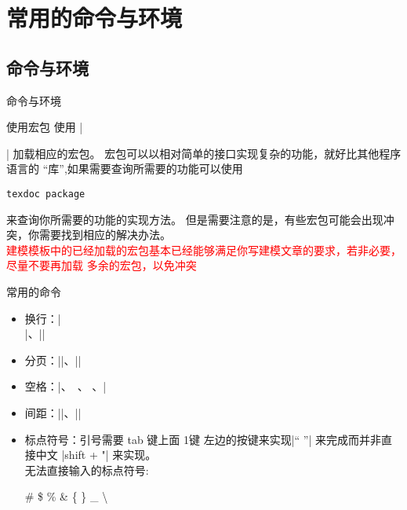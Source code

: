 \section{常用的命令与环境}
\subsection{命令与环境}
\begin{frame}[fragile]{命令与环境}
\end{frame}
	
\begin{frame}[fragile]{使用宏包}
	使用 |\usepackage[option]{package}| 加载相应的宏包。
	宏包可以以相对简单的接口实现复杂的功能，就好比其他程序语言的 ``库'',如果需要查询所需要的功能可以使用
\begin{lstlisting}
texdoc package
\end{lstlisting}
 	来查询你所需要的功能的实现方法。	
 	但是需要注意的是，有些宏包可能会出现冲突，你需要找到相应的解决办法。	\\
 	\textcolor{red}{建模模板中的已经加载的宏包基本已经能够满足你写建模文章的要求，若非必要，尽量不要再加载
 		多余的宏包，以免冲突}
\end{frame}
	
\begin{frame}[fragile]{常用的命令}
	\begin{itemize}
		\item 换行：|\\[space]|、|\linebreak|
		\item 分页：|\newpage|、|\pagebreak|
		\item 空格：|\phantom{arg}、\ 、 \quad、\qquad |
		\item 间距：|\vspace{space}|、|\hspace{space}|
		\item 标点符号：引号需要  tab 键上面 1键 左边的按键来实现|`` ''| 来完成而并非直接中文 |shift +  "| 来实现。	\\
		无法直接输入的标点符号:
		\bigskip	
		\begin{LTXexample}[pos=r]
\# \quad \$ \quad \% \quad \& \quad
\{  \quad \} \quad  \_ \quad 
\textbackslash\end{LTXexample}		
	\end{itemize}
\end{frame}

